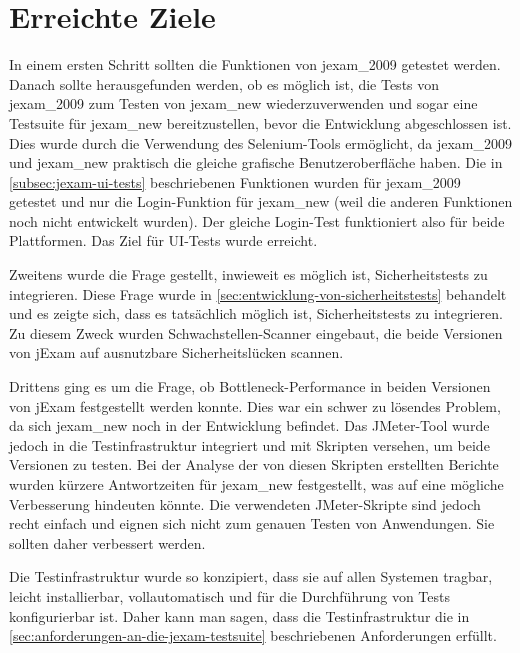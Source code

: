 \section{Erreichte Ziele}

In einem ersten Schritt sollten die Funktionen von \gls{jexam_2009}
getestet werden. Danach sollte herausgefunden werden, ob es möglich 
ist, die Tests von \gls{jexam_2009} zum Testen von \gls{jexam_new} 
wiederzuverwenden und sogar eine Testsuite für \gls{jexam_new} 
bereitzustellen, bevor die Entwicklung abgeschlossen ist. Dies wurde
durch die Verwendung des Selenium-Tools ermöglicht, da 
\gls{jexam_2009} und \gls{jexam_new} praktisch die gleiche grafische 
Benutzeroberfläche haben. Die in \autoref{subsec:jexam-ui-tests} beschriebenen
Funktionen wurden für \gls{jexam_2009} getestet und nur die Login-Funktion
für \gls{jexam_new} (weil die anderen Funktionen noch nicht entwickelt
wurden). Der gleiche Login-Test funktioniert also für beide
Plattformen. Das Ziel für UI-Tests wurde erreicht.

Zweitens wurde die Frage gestellt, inwieweit es möglich ist,
Sicherheitstests zu integrieren. Diese Frage wurde in
\autoref{sec:entwicklung-von-sicherheitstests} behandelt und es
zeigte sich, dass es tatsächlich möglich ist,
Sicherheitstests zu integrieren. Zu diesem Zweck wurden
Schwachstellen-Scanner eingebaut, die beide Versionen von jExam
auf ausnutzbare Sicherheitslücken scannen.


Drittens ging es um die Frage, ob Bottleneck-Performance in beiden
Versionen von jExam festgestellt werden konnte. Dies war ein schwer
zu lösendes Problem, da sich \gls{jexam_new} noch in der Entwicklung
befindet. Das JMeter-Tool wurde jedoch in die Testinfrastruktur
integriert und mit Skripten versehen, um beide Versionen zu testen.
Bei der Analyse der von diesen Skripten erstellten Berichte wurden
kürzere Antwortzeiten für \gls{jexam_new} festgestellt, was auf eine
mögliche Verbesserung hindeuten könnte. Die verwendeten JMeter-Skripte
sind jedoch recht einfach und eignen sich nicht zum genauen Testen
von Anwendungen. Sie sollten daher verbessert werden.


Die Testinfrastruktur wurde so konzipiert, dass sie auf allen
Systemen tragbar, leicht installierbar, vollautomatisch und für
die Durchführung von Tests konfigurierbar ist. Daher kann man
sagen, dass die Testinfrastruktur die in
\autoref{sec:anforderungen-an-die-jexam-testsuite} beschriebenen
Anforderungen erfüllt.




